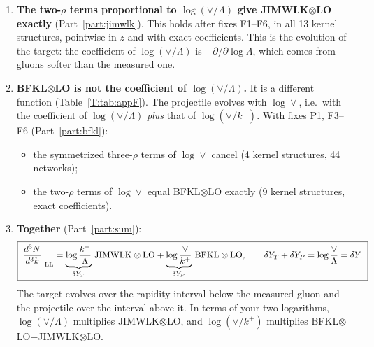 \documentclass[10pt]{article}
\numberwithin{equation}{section}
\newcommand{\bk}{\mathbf k}
\begin{document}
\begin{enumerate}
\begin{itemize}
\begin{itemize}
\item the $\mathfrak F_\alpha$ part of Row II in the $U(w)\mathbb A^{(3)}$ term;
\item part 2 of Row III (the edge kernel $\Phi$), together with a missing term $\mathcal D$.
\end{itemize}
\item \emph{With fixes F3 and F4 all 40 remaining networks cancel exactly}, and a pointwise test gives $10^{-16}$.
\item \emph{F4 is now understood} (Sec.~\ref{sec:alpha}). The $-2\bk^i$ term of the bracket is exactly the commutator $[\mathbb N^{(2)},\mathbb A^{(1)}]$ of the normalization with the LO amplitude. \texttt{main.tex} sets this commutator to zero, but it is not zero. Ordering the virtual factor in $p^+$ (soft part to the left of $\mathbb A^{(1)}$, hard part to the right) is exactly F4. With it the gluon exchanged between the two charges, $\mathfrak F_\alpha$, comes with $\log(\vee/k^+)$ (projectile) instead of $\log(k^+/\Lambda)$ (target).
\end{itemize}
\item \textbf{The two-$\rho$ terms proportional to $\log(\vee/\Lambda)$ give JIMWLK$\otimes$LO exactly} (Part~\ref{part:jimwlk}). This holds after fixes F1--F6, in all 13 kernel structures, pointwise in $z$ and with exact coefficients. This is the evolution of the target: the coefficient of $\log(\vee/\Lambda)$ is $-\partial/\partial\log\Lambda$, which comes from gluons softer than the measured one.
\item \textbf{BFKL$\otimes$LO is not the coefficient of $\log(\vee/\Lambda)$.} It is a different function (Table~\ref{T:tab:appF}). The projectile evolves with $\log\vee$, i.e.\ with the coefficient of $\log(\vee/\Lambda)$ \emph{plus} that of $\log(\vee/k^+)$. With fixes P1, F3--F6 (Part~\ref{part:bfkl}):
\begin{itemize}
\item the symmetrized three-$\rho$ terms of $\log\vee$ cancel (4 kernel structures, 44 networks);
\item the two-$\rho$ terms of $\log\vee$ equal BFKL$\otimes$LO exactly (9 kernel structures, exact coefficients).
\end{itemize}
\item \textbf{Together} (Part~\ref{part:sum}):
\begin{equation*}
\boxed{\;\frac{d^3N}{d^3k}\bigg|_{\rm LL}=\underbrace{\log\frac{k^+}{\Lambda}}_{\delta Y_T}\,\text{JIMWLK}\otimes\text{LO}+\underbrace{\log\frac{\vee}{k^+}}_{\delta Y_P}\,\text{BFKL}\otimes\text{LO},\qquad \delta Y_T+\delta Y_P=\log\frac\vee\Lambda=\delta Y .\;}
\end{equation*}
The target evolves over the rapidity interval below the measured gluon and the projectile over the interval above it. In terms of your two logarithms, $\log(\vee/\Lambda)$ multiplies JIMWLK$\otimes$LO, and $\log(\vee/k^+)$ multiplies BFKL$\otimes$LO$-$JIMWLK$\otimes$LO.
\end{enumerate}
\end{document}
